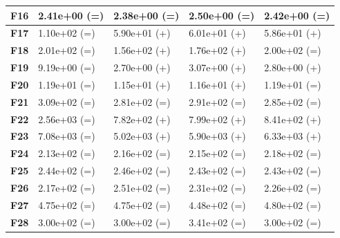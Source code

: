 \documentclass[12pt,a4paper]{report}
\begin{document}
{{{{{{{\begin{table}[h]
\begin{tabular}{|l|l|l|l|l|}
{\bf F16} & 2.41e+00 (=)        & 2.38e+00 (=)     & 2.50e+00 (=)      & 2.42e+00 (=)      \\ \hline
{\bf F17} & 1.10e+02 (=)        & 5.90e+01 (+)     & 6.01e+01 (+)      & 5.86e+01 (+)      \\ \hline
{\bf F18} & 2.01e+02 (=)        & 1.56e+02 (+)     & 1.76e+02 (+)      & 2.00e+02 (=)      \\ \hline
{\bf F19} & 9.19e+00 (=)        & 2.70e+00 (+)     & 3.07e+00 (+)      & 2.80e+00 (+)      \\ \hline
{\bf F20} & 1.19e+01 (=)        & 1.15e+01 (+)     & 1.16e+01 (+)      & 1.19e+01 (=)      \\ \hline
{\bf F21} & 3.09e+02 (=)        & 2.81e+02 (=)     & 2.91e+02 (=)      & 2.85e+02 (=)      \\ \hline
{\bf F22} & 2.56e+03 (=)        & 7.82e+02 (+)     & 7.99e+02 (+)      & 8.41e+02 (+)      \\ \hline
{\bf F23} & 7.08e+03 (=)        & 5.02e+03 (+)     & 5.90e+03 (+)      & 6.33e+03 (+)      \\ \hline
{\bf F24} & 2.13e+02 (=)        & 2.16e+02 (=)     & 2.15e+02 (=)      & 2.18e+02 (=)      \\ \hline
{\bf F25} & 2.44e+02 (=)        & 2.46e+02 (=)     & 2.43e+02 (=)      & 2.43e+02 (=)      \\ \hline
{\bf F26} & 2.17e+02 (=)        & 2.51e+02 (=)     & 2.31e+02 (=)      & 2.26e+02 (=)      \\ \hline
{\bf F27} & 4.75e+02 (=)        & 4.75e+02 (=)     & 4.48e+02 (=)      & 4.80e+02 (=)      \\ \hline
{\bf F28} & 3.00e+02 (=)        & 3.00e+02 (=)     & 3.41e+02 (=)      & 3.00e+02 (=)      \\ \hline
\end{tabular}
\end{table}

}}}}}}}
\end{document}
